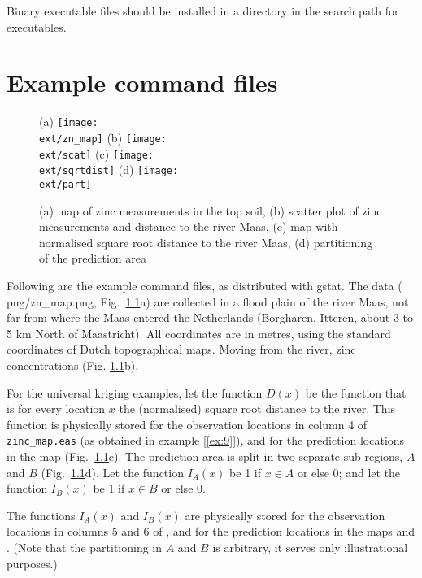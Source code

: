 \documentclass[a4paper,12pt]{book}
\newcommand{\ext}{pdf}
\newcommand{\ex}[1]{example [\ref{ex:#1}]}
\newcommand{\ex}[1]{example [\ref{ex:#1}]}
\begin{document}
Binary executable files should be installed in a directory in the search
path for executables.

\chapter{Example command files}
\label{ch:examples}

\begin{figure}
(a) \texttt{[image: \\ext/zn\_map]} 
(b) \texttt{[image: \\ext/scat]} 
\vspace*{.7cm}
(c) \texttt{[image: \\ext/sqrtdist]} 
(d) \texttt{[image: \\ext/part]} 

\caption {
 (a) map of zinc measurements in the top soil,
 (b) scatter plot of zinc measurements and distance to the river Maas,
 (c) map with normalised square root distance to the river Maas,
 (d) partitioning of the prediction area }
\label{fig:zinc}
\end{figure}

Following are the example command files, as distributed with gstat. The
data (
{png/zn_map.png}, Fig.\ \ref{fig:zinc}a) are collected
in a flood plain of the river Maas, not far from where the Maas
entered the Netherlands (Borgharen, Itteren, about 3 to 5 km North of
Maastricht). All coordinates are in metres, using the standard coordinates
of Dutch topographical maps. Moving from the river, zinc concentrations
(Fig.  \ref{fig:zinc}b).

For the universal kriging examples, let the function $D(x)$ be the
function that is for every location $x$ the (normalised) square
root distance to the river. This function is physically stored
for the observation locations in column 4 of {\tt zinc\_map.eas}
(as obtained in \ex{9}), and for the prediction locations in
the map 
(Fig.\ \ref{fig:zinc}c). The prediction area is split in two
separate sub-regions, $A$ and $B$ (Fig.\ \ref{fig:zinc}d). Let
the function $I_A (x)$ be 1 if $x \in A$ or else 0; and let the function
$I_B (x)$ be 1 if $x \in B$ or else 0.

The functions $I_A (x)$ and $I_B (x)$ are physically stored for the
observation locations in columns 5 and 6 of , and for the prediction locations in
the maps  and
. (Note that the
partitioning in $A$ and $B$ is arbitrary, it serves only illustrational
purposes.)
\end{document}
